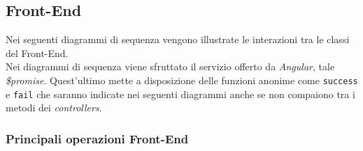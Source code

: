 \subsection{Front-End}
Nei seguenti diagrammi di sequenza vengono illustrate le interazioni tra le classi del Front-End. \\
Nei diagrammi di sequenza viene sfruttato il servizio offerto da \textit{Angular}, tale  \textit{\$promise}. Quest'ultimo mette a disposizione delle funzioni anonime come \texttt{success} e \texttt{fail} che saranno indicate nei seguenti diagrammi anche se non compaiono tra i metodi dei \textit{controllers}.
\subsubsection{Principali operazioni Front-End}